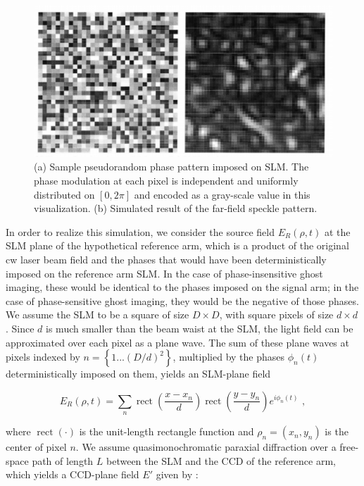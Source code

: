 \begin{figure}[t]
\begin{center}
\includegraphics[width=13cm]{figure-ghost-slm-speckle.pdf}
\caption{(a) Sample pseudorandom phase pattern imposed on SLM. The phase modulation at each pixel is independent and uniformly distributed on $\left[0, 2\pi \right]$ and encoded as a gray-scale value in this visualization. (b) Simulated result of the far-field speckle pattern.}
\label{figure:ghost-slm-speckle}
\end{center}
\end{figure}

In order to realize this simulation, we consider the source field $E_R(\rho, t)$ at the SLM plane of the hypothetical reference arm, which is a product of the original cw laser beam field and the phases that would have been deterministically imposed on the reference arm SLM. In the case of phase-insensitive ghost imaging, these would be identical to the phases imposed on the signal arm; in the case of phase-sensitive ghost imaging, they would be the negative of those phases. We assume the SLM to be a square of size $D \times D$, with square pixels of size $d \times d$. Since $d$ is much smaller than the beam waist at the SLM, the light field can be approximated over each pixel as a plane wave. The sum of these plane waves at pixels indexed by $n = \left\{1 ... (D/d)^2\right\}$, multiplied by the phases $\phi_n(t)$ deterministically imposed on them, yields an SLM-plane field

\begin{equation}
E_R(\rho, t) = \sum_n \operatorname{rect}\left(\frac{x-x_n}{d}\right) \operatorname{rect}\left(\frac{y-y_n}{d}\right) e^{i\phi_n(t)}\,\,,
\end{equation}

where $\operatorname{rect}(\cdot)$ is the unit-length rectangle function and $\rho_n = (x_n,y_n)$ is the center of pixel $n$. We assume quasimonochromatic paraxial diffraction over a free-space path of length $L$ between the SLM and the CCD of the reference arm, which yields a CCD-plane field $E'$ given by \cite{hardy-thesis}:

